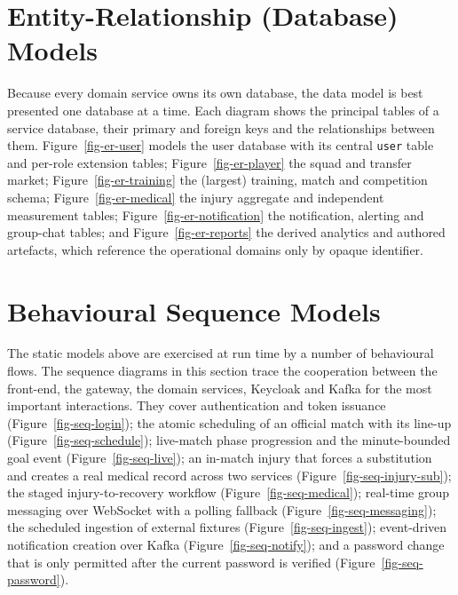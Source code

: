 







\section{Entity-Relationship (Database) Models}
\label{sec:design-er}

Because every domain service owns its own database, the data model is best
presented one database at a time. Each diagram shows the principal tables of a
service database, their primary and foreign keys and the relationships between
them. Figure~\ref{fig-er-user} models the user database with its central
\texttt{user} table and per-role extension tables;
Figure~\ref{fig-er-player} the squad and transfer market;
Figure~\ref{fig-er-training} the (largest) training, match and competition
schema; Figure~\ref{fig-er-medical} the injury aggregate and independent
measurement tables; Figure~\ref{fig-er-notification} the notification,
alerting and group-chat tables; and Figure~\ref{fig-er-reports} the derived
analytics and authored artefacts, which reference the operational domains only
by opaque identifier.








\section{Behavioural Sequence Models}
\label{sec:design-seq}

The static models above are exercised at run time by a number of behavioural
flows. The sequence diagrams in this section trace the cooperation between the
front-end, the gateway, the domain services, Keycloak and Kafka for the most
important interactions. They cover authentication and token issuance
(Figure~\ref{fig-seq-login}); the atomic scheduling of an official match with
its line-up (Figure~\ref{fig-seq-schedule}); live-match phase progression and
the minute-bounded goal event (Figure~\ref{fig-seq-live}); an in-match injury
that forces a substitution and creates a real medical record across two services
(Figure~\ref{fig-seq-injury-sub}); the staged injury-to-recovery workflow
(Figure~\ref{fig-seq-medical}); real-time group messaging over WebSocket with a
polling fallback (Figure~\ref{fig-seq-messaging}); the scheduled ingestion of
external fixtures (Figure~\ref{fig-seq-ingest}); event-driven notification
creation over Kafka (Figure~\ref{fig-seq-notify}); and a password change that is
only permitted after the current password is verified
(Figure~\ref{fig-seq-password}).

